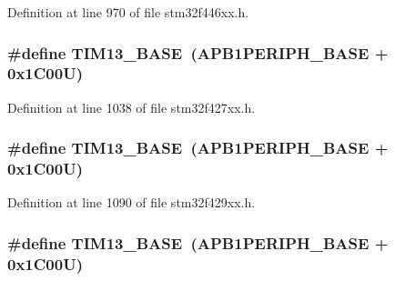 Definition at line 970 of file stm32f446xx.\+h.

\subsubsection[{\texorpdfstring{T\+I\+M13\+\_\+\+B\+A\+SE}{TIM13_BASE}}]{\setlength{\rightskip}{0pt plus 5cm}\#define T\+I\+M13\+\_\+\+B\+A\+SE~({\bf A\+P\+B1\+P\+E\+R\+I\+P\+H\+\_\+\+B\+A\+SE} + 0x1\+C00\+U)}\hypertarget{group___peripheral__memory__map_gad20f79948e9359125a40bbf6ed063590}{}\label{group___peripheral__memory__map_gad20f79948e9359125a40bbf6ed063590}


Definition at line 1038 of file stm32f427xx.\+h.

\subsubsection[{\texorpdfstring{T\+I\+M13\+\_\+\+B\+A\+SE}{TIM13_BASE}}]{\setlength{\rightskip}{0pt plus 5cm}\#define T\+I\+M13\+\_\+\+B\+A\+SE~({\bf A\+P\+B1\+P\+E\+R\+I\+P\+H\+\_\+\+B\+A\+SE} + 0x1\+C00\+U)}\hypertarget{group___peripheral__memory__map_gad20f79948e9359125a40bbf6ed063590}{}\label{group___peripheral__memory__map_gad20f79948e9359125a40bbf6ed063590}


Definition at line 1090 of file stm32f429xx.\+h.

\subsubsection[{\texorpdfstring{T\+I\+M13\+\_\+\+B\+A\+SE}{TIM13_BASE}}]{\setlength{\rightskip}{0pt plus 5cm}\#define T\+I\+M13\+\_\+\+B\+A\+SE~({\bf A\+P\+B1\+P\+E\+R\+I\+P\+H\+\_\+\+B\+A\+SE} + 0x1\+C00\+U)}\hypertarget{group___peripheral__memory__map_gad20f79948e9359125a40bbf6ed063590}{}\label{group___peripheral__memory__map_gad20f79948e9359125a40bbf6ed063590}


